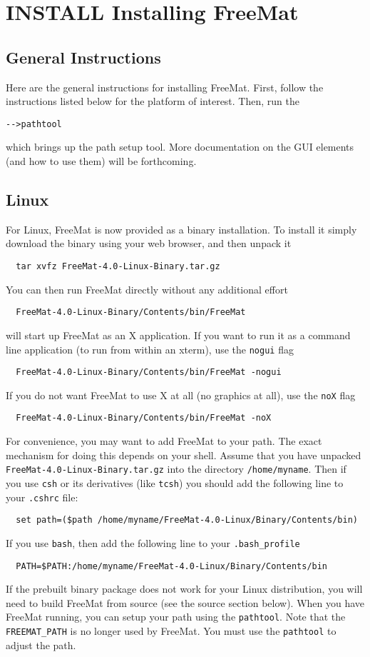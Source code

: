 \section{INSTALL Installing FreeMat}

\subsection{General Instructions}

Here are the general instructions for installing FreeMat.  First, follow the 
instructions listed below for the platform of interest.  Then, run the
\begin{verbatim}
-->pathtool
\end{verbatim}
which brings up the path setup tool.  More documentation on the GUI elements
(and how to use them) will be forthcoming.  
\subsection{Linux}

For Linux, FreeMat is now provided as a binary installation.  To install it
simply download the binary using your web browser, and then unpack it
\begin{verbatim}
  tar xvfz FreeMat-4.0-Linux-Binary.tar.gz
\end{verbatim}
You can then run FreeMat directly without any additional effort
\begin{verbatim}
  FreeMat-4.0-Linux-Binary/Contents/bin/FreeMat
\end{verbatim}
will start up FreeMat as an X application.  If you want to run it
as a command line application (to run from within an xterm), use
the \verb|nogui| flag
\begin{verbatim}
  FreeMat-4.0-Linux-Binary/Contents/bin/FreeMat -nogui
\end{verbatim}
If you do not want FreeMat to use X at all (no graphics at all), use
the \verb|noX| flag
\begin{verbatim}
  FreeMat-4.0-Linux-Binary/Contents/bin/FreeMat -noX
\end{verbatim}
For convenience, you may want to add FreeMat to your path.  The exact
mechanism for doing this depends on your shell.  Assume that you have
unpacked \verb|FreeMat-4.0-Linux-Binary.tar.gz| into the directory
\verb|/home/myname|.  Then if you use \verb|csh| or its derivatives (like \verb|tcsh|)
you should add the following line to your \verb|.cshrc| file:
\begin{verbatim}
  set path=($path /home/myname/FreeMat-4.0-Linux/Binary/Contents/bin)
\end{verbatim}
If you use \verb|bash|, then add the following line to your \verb|.bash_profile|
\begin{verbatim}
  PATH=$PATH:/home/myname/FreeMat-4.0-Linux/Binary/Contents/bin
\end{verbatim}
If the prebuilt binary package does not work for your Linux distribution, you
will need to build FreeMat from source (see the source section below).  When
you have FreeMat running, you can setup your path using the \verb|pathtool|.  Note
that the \verb|FREEMAT_PATH| is no longer used by FreeMat.  You must use the \verb|pathtool|
to adjust the path.
